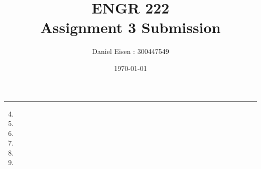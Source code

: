 \documentclass[11pt]{article}
\title{ENGR 222 \\ Assignment 3 Submission}
\author{Daniel Eisen : 300447549}
\date{\today}
\begin{document}
\begin{preview}

      \maketitle
      \hrule
      \begin{enumerate}
            \setcounter{enumi}{3}
            \item 
            \item 
            \setcounter{enumi}{6}
            \item 
            \item 
            \item 
            \item 
      \end{enumerate}
\end{preview}
\end{document}
